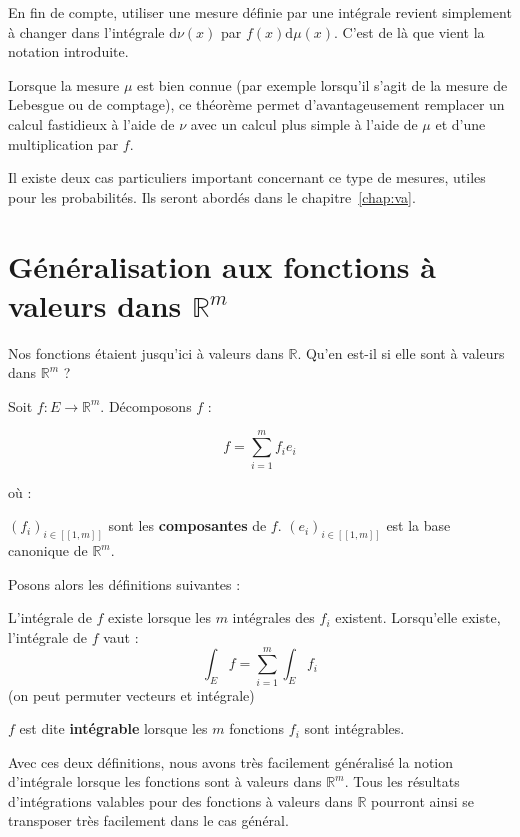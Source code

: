 \documentclass[../integ-proba.tex]{subfiles}
\begin{document}
    \begin{rem}
        En fin de compte, utiliser une mesure définie par une intégrale revient simplement à changer dans l'intégrale $\text{d}\nu(x)$ par $f(x) \text{d}\mu(x)$.
        C'est de là que vient la notation introduite.

        Lorsque la mesure $\mu$ est bien connue (par exemple lorsqu'il s'agit de la mesure de Lebesgue ou de comptage), ce théorème permet d'avantageusement remplacer un calcul fastidieux à l'aide de $\nu$ avec un calcul plus simple à l'aide de $\mu$ et d'une multiplication par $f$.
    \end{rem}

  Il existe deux cas particuliers important concernant ce type de mesures, utiles pour les probabilités.
  Ils seront abordés dans le chapitre~\ref{chap:va}.

  \section{Généralisation aux fonctions à valeurs dans $\mathbb{R}^m$}

  Nos fonctions étaient jusqu'ici à valeurs dans $\mathbb{R}$.
  Qu'en est-il si elle sont à valeurs dans $\mathbb{R}^m$ ?

  Soit $f:E\longrightarrow \mathbb{R}^m$.
  Décomposons $f$ :

  \begin{displaymath}
    f = \sum_{i=1}^{m}f_i e_i
  \end{displaymath}

  où :
  \begin{itemize}
    \itemb $\left(f_i\right)_{i\in[\![1,m]\!]}$ sont les \textbf{composantes} de $f$.
    \itemb $\left(e_i\right)_{i\in[\![1,m]\!]}$ est la base canonique de $\mathbb{R}^m$.
  \end{itemize}

  Posons alors les définitions suivantes :

  \begin{defi}
    L'intégrale de $f$ existe lorsque les $m$ intégrales des $f_i$ existent.
    Lorsqu'elle existe, l'intégrale de $f$ vaut :
    \begin{displaymath}
      \int_E f = \sum_{i=1}^{m}\int_E f_i
    \end{displaymath}
    (on peut permuter vecteurs et intégrale)
  \end{defi}

  \begin{defi}
    $f$ est dite \textbf{intégrable} lorsque les $m$ fonctions $f_i$ sont intégrables.
  \end{defi}

  Avec ces deux définitions, nous avons très facilement généralisé la notion d'intégrale lorsque les fonctions sont à valeurs dans $\mathbb{R}^m$.
  Tous les résultats d'intégrations valables pour des fonctions à valeurs dans $\mathbb{R}$ pourront ainsi se transposer très facilement dans le cas général.
\end{document}
